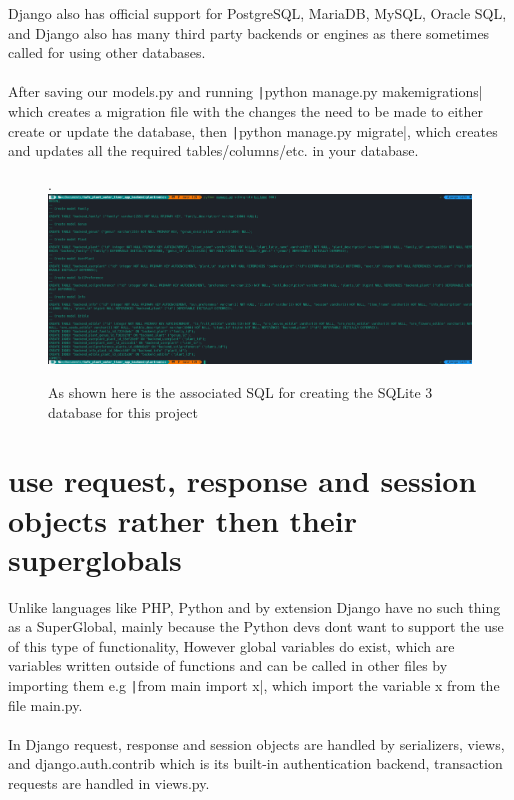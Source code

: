 \documentclass{article}
\begin{document}
    Django also has official support for PostgreSQL, MariaDB, MySQL, Oracle SQL, and Django also has many third party backends or engines as there sometimes called for using other databases.
    \\
    \\
    After saving our models.py and running \texttt|python manage.py makemigrations|
    which creates a migration file with the changes the need to be made to either create or update the database,
    then \texttt|python manage.py migrate|,
    which creates and updates all the required tables/columns/etc. in your database.
   
    
    \begin{figure}[!htb]
        \caption{As shown here is the associated SQL for creating the SQLite 3 database for this project}.
        \centering
        \includegraphics[scale=0.35]{sqlb1}
    \end{figure}

     \newpage

    \section{use request, response and session objects rather then their superglobals}
    
    Unlike languages like PHP, Python and by extension Django have no such thing as a SuperGlobal, mainly because the Python devs dont want to support the use of this type of functionality, However global variables do exist, which are variables written outside of functions and can be called in other files by importing them e.g \texttt|from main import x|, which import the variable x from the file main.py.
    \\
    \\
    In Django request, response and session objects are handled by serializers, views, and django.auth.contrib which is its built-in authentication backend, transaction requests are handled in views.py.
    
\end{document}
